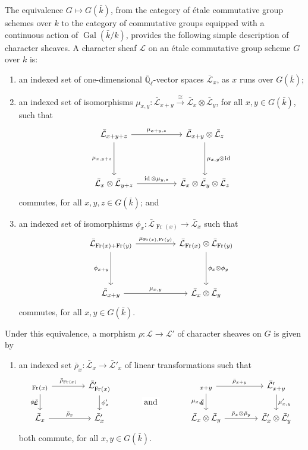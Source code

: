 \documentclass[10pt]{amsart}
\makeatletter
\theoremstyle{plain}
\theoremstyle{definition}
\newcommand{\EE}{\mathbb{\bar Q}_\ell}
\newcommand{\bFq}{\bar{k}}
\newcommand{\Fq}{k}
\DeclareMathOperator{\Gal}{Gal}
\newcommand{\Frob}[1]{\operatorname{Fr}_{#1}}
\DeclareMathOperator{\id}{id}
\newcommand{\iso}{{\ \cong\ }}
\newcommand{\cs}[1]{{\mathcal{#1}}}
\newcommand{\gcs}[1]{{\mathcal{\bar #1}}}
\newcommand{\labitem}[2]{
\def\@itemlabel{\textbf{#1}}
\item
\def\@currentlabel{#1}\label{#2}}
\newcommand{\brho}{{\bar\rho}}
\newcommand{\tight}[3]{\hspace{-#1pt}{#2}\hspace{-#3pt}}
\makeatother
\begin{document}
The equivalence $G \mapsto G(\bFq)$,
from the category of \'etale commutative group schemes over $\Fq$ to the category of commutative groups equipped
with a continuous action of $\Gal(\bFq/\Fq)$,
provides the following simple description of character sheaves.
%
A character sheaf $\cs{L}$ on an \'etale commutative group scheme $G$ over $\Fq$ is:
\begin{enumerate}
 \labitem{(cs.1)}{cs.1} an indexed set of one-dimensional
  $\EE$-vector spaces $\gcs{L}_x$, as $x$ runs over
  $G(\bFq)$;

 \labitem{(cs.2)}{cs.2} an indexed set of isomorphisms
  $\mu_{x,y} : \gcs{L}_{x+y} \xrightarrow{\iso} \gcs{L}_{x} \otimes\gcs{L}_{y}$,
  for all $x,y \in G(\bFq)$, such that
  \[
   \begin{tikzcd}[row sep=40]
    \gcs{L}_{x+y+z} \arrow{rr}{\mu_{x+y,z}} \arrow[swap]{d}{\mu_{x,y+z}}
    && \gcs{L}_{x+y}\otimes\gcs{L}_{z} \dar{\mu_{x,y} \tight{0.5}{\otimes}{1} \id} \\
    \gcs{L}_{x} \otimes\gcs{L}_{y+z} \arrow{rr}{\id \otimes\mu_{y,z}}
    && \gcs{L}_{x} \otimes\gcs{L}_{y} \otimes\gcs{L}_{z}
   \end{tikzcd}
  \]
  commutes, for all $x,y,z\in G(\bFq)$; and
 \labitem{(cs.3)}{cs.3} an indexed set of isomorphisms $\phi_{x} : \gcs{L}_{\Frob{}(x)} \to \gcs{L}_x$
  such that
  \[
   \begin{tikzcd}[row sep=40]
    \gcs{L}_{\Frob{}(x)+\Frob{}(y)} \arrow[swap]{d}{\phi_{x+y}} \arrow{rr}{\mu_{\Frob{}(x),\Frob{}(y)}}
    && \gcs{L}_{\Frob{}(x)}\otimes\gcs{L}_{\Frob{}(y)} \dar{\phi_x \tight{0}{\otimes}{0} \phi_y} \\
    \gcs{L}_{x+y} \arrow{rr}{\mu_{x,y}}
    && \gcs{L}_x \otimes\gcs{L}_y
   \end{tikzcd}
  \]
  commutes, for all $x,y\in G(\bFq)$.
\end{enumerate}
Under this equivalence, a morphism $\rho : \cs{L} \to \cs{L'}$ of character sheaves on $G$ is given by
\begin{enumerate}
 \labitem{(cs.4)}{cs.4} an indexed set $\brho_x : \gcs{L}_x \to \gcs{L'}_x$
  of linear transformations such that
  \[
   \begin{tikzcd}[column sep=40]
    \arrow[swap]{d}{\phi_x} \gcs{L}_{\Frob{}(x)} \rar{\brho_{\Frob{}(x)}} & \gcs{L'}_{\Frob{}(x)} \dar{\phi_x'}
    &\arrow[draw=none]{d}[pos=.4,description]{\text{\normalsize{and}}}
    & \arrow[swap]{d}{\mu_{x,y}} \gcs{L}_{x+y} \rar{\brho_{x+y}} & \gcs{L'}_{x+y} \dar{\mu'_{x,y}} \\
    \gcs{L}_x \rar{\brho_x} & \gcs{L'}_x
    & {} & \gcs{L}_x\otimes\gcs{L}_y \rar{\brho_x\otimes\brho_y} & \gcs{L'}_x \otimes\gcs{L'}_y
   \end{tikzcd}
  \]
  both commute, for all $x, y \in G(\bFq)$.
\end{enumerate}
\end{document}

